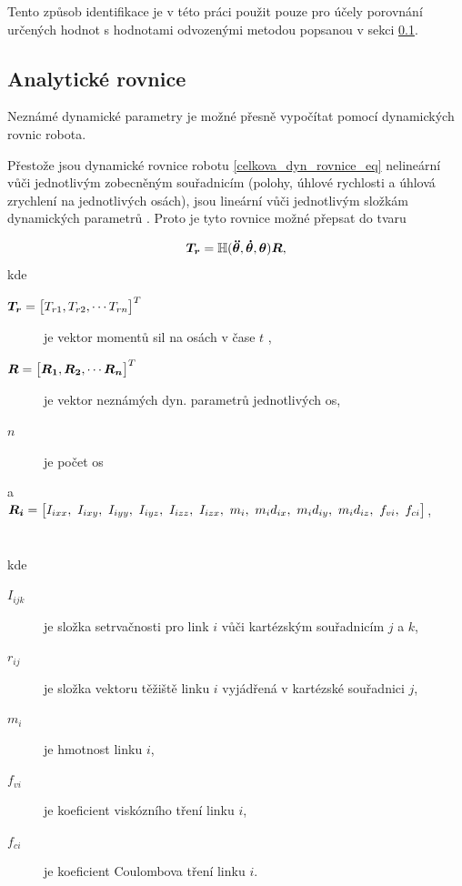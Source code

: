 Tento způsob identifikace je v této práci použit pouze pro účely porovnání určených hodnot s hodnotami odvozenými metodou popsanou v sekci \ref{z_rovnic_sec}.
\label{z_3d_modelu_sec}

\subsection{Analytické rovnice}
\label{z_rovnic_sec}
Neznámé dynamické parametry je možné přesně vypočítat pomocí dynamických rovnic robota. 

Přestože jsou dynamické rovnice robotu \eqref{celkova_dyn_rovnice_eq} nelineární vůči jednotlivým zobecněným souřadnicím (polohy, úhlové rychlosti a úhlová zrychlení na jednotlivých osách), jsou lineární vůči jednotlivým složkám dynamických parametrů \cite{clos_dyn_par}\cite{dyn_mod_ind}. Proto je tyto rovnice možné přepsat do tvaru

\begin{equation}
\boldsymbol{T_r} = \mathbb{H}(\boldsymbol{\ddot{\theta}},\boldsymbol{\dot{\theta}},\boldsymbol{\theta})\boldsymbol{R},
\label{eq_lin_par}
\end{equation}
kde
\begin{description}
\item[$\boldsymbol{T_r} = {\big[T_{r1}, T_{r2},  \dotsm  T_{rn}\big]}^{T}$] je vektor momentů sil na osách v čase $t$ ,
\item[$\boldsymbol{R} = {\big[\boldsymbol{R_1}, \boldsymbol{R_2},  \dotsm  \boldsymbol{R_n}\big]}^{T}$] je vektor neznámých dyn. parametrů jednotlivých os,
\item[$n$] je počet os
\end{description} \noindent
a \ \ \ \ \ \ $\vect{R_i} = {\big[I_{ixx}, \ I_{ixy}, \ I_{iyy}, \ I_{iyz}, \ I_{izz}, \ I_{izx}, \ m_i, \ m_id_{ix}, \ m_id_{iy}, \ m_id_{iz}, \ f_{vi}, \ f_{ci}\big]}$, \\
\\
\\
kde
\noindent
\begin{description}
\item[$I_{ijk}$] je složka setrvačnosti pro link $i$ vůči kartézským souřadnicím $j$ a $k$,
\item[$r_{ij}$] je složka vektoru těžiště linku $i$ vyjádřená v kartézské souřadnici $j$,
\item[$m_{i}$] je hmotnost linku $i$,
\item[$f_{vi}$] je koeficient viskózního tření linku $i$,
\item[$f_{ci}$] je koeficient Coulombova tření linku $i$.
\end{description}

